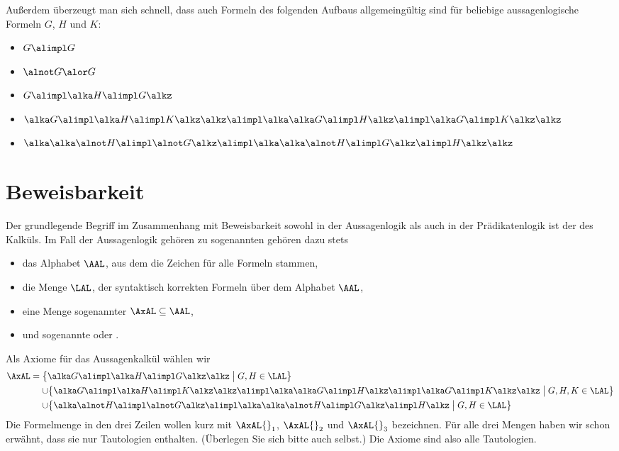 % 
Außerdem überzeugt man sich schnell, dass auch Formeln des folgenden
Aufbaus allgemeingültig sind für beliebige aussagenlogische Formeln
$G$, $H$ und $K$:
\begin{itemize}
\item $G\alimpl G$
\item $\alnot G\alor G$
\item $G\alimpl \alka H\alimpl G\alkz$
\item $\alka G\alimpl \alka H\alimpl K\alkz\alkz
  \alimpl \alka \alka G \alimpl H\alkz\alimpl\alka G\alimpl K\alkz\alkz $
\item $\alka\alka\alnot H\alimpl \alnot G\alkz\alimpl \alka\alka\alnot
  H\alimpl G\alkz\alimpl H\alkz\alkz$
\end{itemize}


\section{Beweisbarkeit}
\label{sec:beweisbarkeit}

Der grundlegende Begriff im Zusammenhang mit Beweisbarkeit sowohl in
der Aussagenlogik als auch in der Prädikatenlogik ist der des Kalküls.
%
Im Fall der Aussagenlogik gehören zu sogenannten
 gehören dazu stets
\begin{itemize}
\item das Alphabet $\AAL$, aus dem die Zeichen für alle Formeln stammen,
\item die Menge $\LAL$,
  der syntaktisch korrekten Formeln über dem Alphabet $\AAL$,
\item eine Menge sogenannter  $\AxAL\subseteq\AAL$,
\item und sogenannte  oder . 
\end{itemize}
% 
Als Axiome für das Aussagenkalkül wählen wir 
\begin{align*}
  \AxAL &= \bigl\{\alka G\alimpl \alka H\alimpl  G\alkz\alkz
          \bigm| G,H\in\LAL \bigr\} \\
        &\mathrel{\hphantom{=}} \cup \bigl\{\alka G\alimpl \alka H\alimpl  K\alkz\alkz
          \alimpl \alka\alka G\alimpl H\alkz\alimpl \alka G\alimpl  K\alkz\alkz \bigm| G,H,K\in\LAL \bigr\}\\
        &\mathrel{\hphantom{=}} \cup \bigl\{
          \alka\alnot H\alimpl \alnot G\alkz\alimpl \alka\alka\alnot H\alimpl G\alkz\alimpl  H\alkz
          \bigm| G,H \in\LAL 
          \bigr\}
\end{align*}
%
Die Formelmenge in den drei Zeilen wollen kurz mit $\AxAL{}_1$,
$\AxAL{}_2$ und $\AxAL{}_3$ bezeichnen.
%
Für alle drei Mengen haben wir schon erwähnt, dass sie nur Tautologien
enthalten.
%
(Überlegen Sie sich bitte auch selbst.)
%
Die Axiome sind also alle Tautologien.

